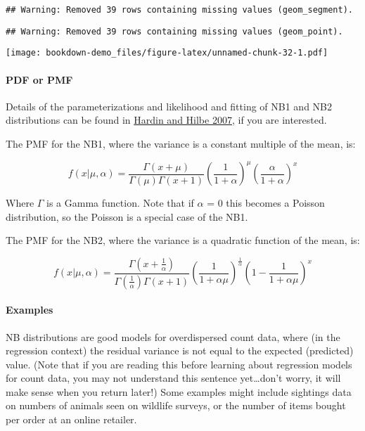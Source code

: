 \documentclass[]{book}
\let\oldparagraph\paragraph
\renewcommand{\paragraph}[1]{\oldparagraph{#1}\mbox{}}
\begin{document}
\begin{verbatim}
## Warning: Removed 39 rows containing missing values (geom_segment).
\end{verbatim}

\begin{verbatim}
## Warning: Removed 39 rows containing missing values (geom_point).
\end{verbatim}

\texttt{[image: bookdown-demo\_files/figure-latex/unnamed-chunk-32-1.pdf]}

\hypertarget{pdf-or-pmf-5}{%
\paragraph{PDF or PMF}\label{pdf-or-pmf-5}}

Details of the parameterizations and likelihood and fitting of NB1 and NB2 distributions can be found in \href{https://www.amazon.com/Generalized-Linear-Models-Extensions-Third/dp/1597181056/ref=sr_1_1?s=books\&ie=UTF8\&qid=1538705158\&sr=1-1\&keywords=Generalized+Linear+Models+and+Extensions\%3A+third+edition}{Hardin and Hilbe 2007}, if you are interested.

The PMF for the NB1, where the variance is a constant multiple of the mean, is:

\[ f(x \vert \mu, \alpha) = \frac{\Gamma(x + \mu)}{\Gamma(\mu)\Gamma(x+1)}(\frac{1}{1+\alpha})^\mu(\frac{\alpha}{1+\alpha})^x \]

Where \(\Gamma\) is a Gamma function. Note that if \(\alpha\) = 0 this becomes a Poisson distribution, so the Poisson is a special case of the NB1.

The PMF for the NB2, where the variance is a quadratic function of the mean, is:

\[ f(x \vert \mu, \alpha) = \frac{\Gamma(x + \frac{1}{\alpha})}{\Gamma(\frac{1}{\alpha})\Gamma(x+1)}(\frac{1}{1+\alpha \mu})^{\frac{1}{\alpha}}(1 - \frac{1}{1+\alpha \mu})^x \]

\hypertarget{examples-5}{%
\paragraph{Examples}\label{examples-5}}

NB distributions are good models for overdispersed count data, where (in the regression context) the residual variance is not equal to the expected (predicted) value. (Note that if you are reading this before learning about regression models for count data, you may not understand this sentence yet\ldots don't worry, it will make sense when you return later!) Some examples might include sightings data on numbers of animals seen on wildlife surveys, or the number of items bought per order at an online retailer.
\end{document}
